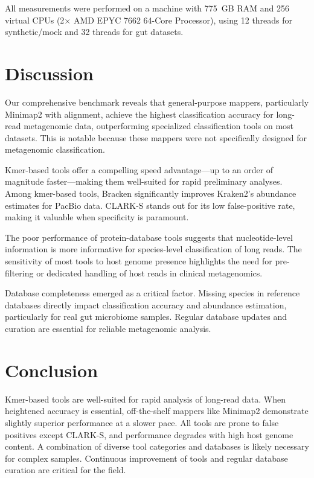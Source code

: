 \documentclass{article}
\begin{document}
All measurements were performed on a machine with 775~GB RAM and 256 virtual CPUs (2$\times$ AMD EPYC 7662 64-Core Processor), using 12 threads for synthetic/mock and 32 threads for gut datasets.

\section{Discussion}

Our comprehensive benchmark reveals that general-purpose mappers, particularly Minimap2 with alignment, achieve the highest classification accuracy for long-read metagenomic data, outperforming specialized classification tools on most datasets. This is notable because these mappers were not specifically designed for metagenomic classification.

Kmer-based tools offer a compelling speed advantage---up to an order of magnitude faster---making them well-suited for rapid preliminary analyses. Among kmer-based tools, Bracken significantly improves Kraken2's abundance estimates for PacBio data. CLARK-S stands out for its low false-positive rate, making it valuable when specificity is paramount.

The poor performance of protein-database tools suggests that nucleotide-level information is more informative for species-level classification of long reads. The sensitivity of most tools to host genome presence highlights the need for pre-filtering or dedicated handling of host reads in clinical metagenomics.

Database completeness emerged as a critical factor. Missing species in reference databases directly impact classification accuracy and abundance estimation, particularly for real gut microbiome samples. Regular database updates and curation are essential for reliable metagenomic analysis.

\section{Conclusion}

Kmer-based tools are well-suited for rapid analysis of long-read data. When heightened accuracy is essential, off-the-shelf mappers like Minimap2 demonstrate slightly superior performance at a slower pace. All tools are prone to false positives except CLARK-S, and performance degrades with high host genome content. A combination of diverse tool categories and databases is likely necessary for complex samples. Continuous improvement of tools and regular database curation are critical for the field.



\end{document}

